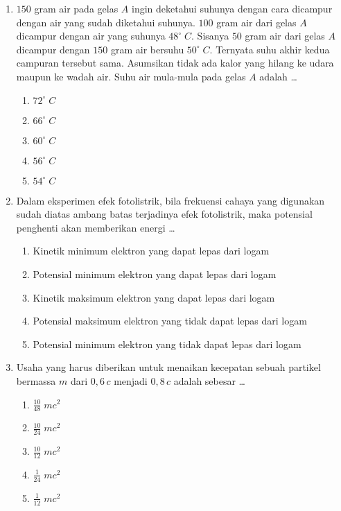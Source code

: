 \documentclass[A4,12PT, english, twocolumn]{journal}
\begin{document}
\begin{enumerate}
\item $150$ gram air pada gelas $A$ ingin deketahui suhunya dengan cara dicampur dengan air yang sudah diketahui suhunya. $100$ gram air dari gelas $A$ dicampur dengan air yang suhunya $48^\circ \; C$. Sisanya $50$ gram air dari gelas $A$ dicampur dengan $150$ gram air bersuhu $50^\circ \; C$. Ternyata suhu akhir kedua campuran tersebut sama. Asumsikan tidak ada kalor yang hilang ke udara maupun ke wadah air. Suhu air mula-mula pada gelas $A$ adalah \dots
    \begin{enumerate}
        \item $72^\circ \; C$
        \item $66^\circ \; C$
        \item $60^\circ \; C$
        \item $56^\circ \; C$
        \item $54^\circ \; C$
    \end{enumerate}

\item Dalam eksperimen efek fotolistrik, bila frekuensi cahaya yang digunakan sudah diatas ambang batas terjadinya efek fotolistrik, maka potensial penghenti akan memberikan energi \dots
    \begin{enumerate}
        \item Kinetik minimum elektron yang dapat lepas dari logam
        \item Potensial minimum elektron yang dapat lepas dari logam
        \item Kinetik maksimum elektron yang dapat lepas dari logam
        \item Potensial maksimum elektron yang tidak dapat lepas dari logam
        \item Potensial minimum elektron yang tidak dapat lepas dari logam
    \end{enumerate}
 
\item Usaha yang harus diberikan untuk menaikan kecepatan sebuah partikel bermassa $m$ dari $0,6 \, c$ menjadi $0,8 \, c$ adalah sebesar \dots
    \begin{enumerate}
        \item $\frac{10}{48} \; mc^2$
        \item $\frac{10}{24} \; mc^2$
        \item $\frac{10}{12} \; mc^2$
        \item $\frac{1}{24} \; mc^2$
        \item $\frac{1}{12} \; mc^2$
    \end{enumerate}


\end{enumerate}
\end{document}
